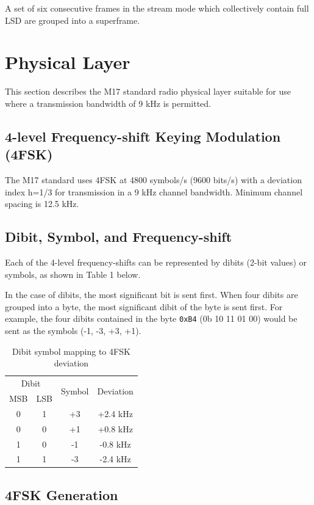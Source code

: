 \documentclass[a4paper,11pt,oneside]{book}
\makeatletter
\renewcommand{\mainmatter}{\cleardoublepage\@mainmattertrue}
\makeatother
\begin{document}
A set of six consecutive frames in the stream mode which collectively contain full LSD are grouped into a superframe.

\mainmatter
\chapter{Physical Layer}

This section describes the M17 standard radio physical layer suitable
for use where a transmission bandwidth of 9 kHz is permitted.

\section{4-level Frequency-shift Keying Modulation (4FSK)}

The M17 standard uses 4FSK at 4800 symbols/s (9600 bits/s) with a deviation index h=1/3 for transmission in a 9 kHz channel bandwidth. Minimum channel spacing is 12.5 kHz.

\section{Dibit, Symbol, and Frequency-shift}

Each of the 4-level frequency-shifts can be represented by dibits (2-bit values) or symbols, as shown in Table 1 below.

In the case of dibits, the most significant bit is sent first. When four dibits are grouped into a byte, the most significant dibit of the byte
is sent first. For example, the four dibits contained in the byte \texttt{0xB4} (0b 10 11 01 00) would be sent as the symbols (-1, -3, +3, +1).

\begin{table}[H]
	\centering
	\begin{tabular}{|c|c|c|c|}
		\hline
		\multicolumn{2}{|c|}{Dibit} & \multirow{2}{*}{Symbol} & \multirow{2}{*}{Deviation} \\
		MSB & LSB &  &  \\
		\hline
		0 & 1 & +3 & +2.4 kHz \\
		0 & 0 & +1 & +0.8 kHz \\
		1 & 0 & -1 & -0.8 kHz \\
		1 & 1 & -3 & -2.4 kHz \\
		\hline
	\end{tabular}
	\caption{Dibit symbol mapping to 4FSK deviation}
\end{table}

\section{4FSK Generation}
\end{document}
